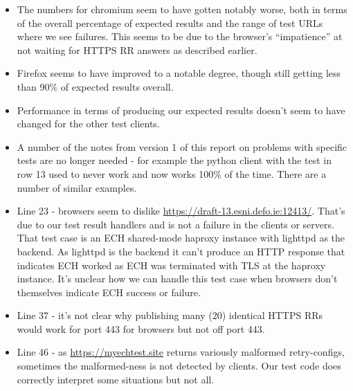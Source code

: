 \begin{itemize}

    \item The numbers for chromium seem to have gotten notably worse, both in
        terms of the overall percentage of expected results and the range of
        test URLs where we see failures. This seems to be due to the browser's
        ``impatience'' at not waiting for HTTPS RR answers as described earlier.

   \item Firefox seems to have improved to a notable degree, though still getting
       less than 90\% of expected results overall.

   \item Performance in terms of producing our expected results doesn't seem to
       have changed for the other test clients.

   \item A number of the notes from version 1 of this report on problems with
       specific tests are no longer needed - for example the python client with
       the test in row 13 used to never work and now works 100\% of the time.
       There are a number of similar examples.

    \item Line 23 - browsers seem to dislike
        \url{https://draft-13.esni.defo.ie:12413/}.  That's due to our test
        result handlers and is not a failure in the clients or servers. That test case is
        an ECH shared-mode haproxy instance with lighttpd as the backend. As
        lighttpd is the backend it can't produce an HTTP response that
        indicates ECH worked as ECH was terminated with TLS at the haproxy
        instance. It's unclear how we can handle this test case when browsers
        don't themselves indicate ECH success or failure.

    \item Line 37 - it's not clear why publishing many (20) identical HTTPS RRs
        would work for port 443 for browsers but not off port 443.

    \item Line 46 - as \url{https://myechtest.site} returns variously malformed
        retry-configs, sometimes the malformed-ness is not detected by clients.
        Our test code does correctly interpret some situations but not all.


\end{itemize}
